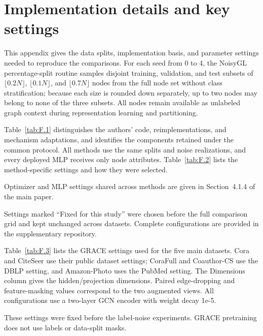 \documentclass[10pt,letterpaper,nopreprintline]{elsarticle}
\begin{document}
\setcounter{table}{0}

\section{Implementation details and key settings}\label{sec:F}

This appendix gives the data splits, implementation basis, and parameter settings needed to reproduce the comparisons. For each seed from 0 to 4, the NoisyGL percentage-split routine samples disjoint training, validation, and test subsets of \(\lfloor 0.2N\rfloor\), \(\lfloor 0.1N\rfloor\), and \(\lfloor 0.7N\rfloor\) nodes from the full node set without class stratification; because each size is rounded down separately, up to two nodes may belong to none of the three subsets. All nodes remain available as unlabeled graph context during representation learning and partitioning.

Table~\ref{tab:F.1} distinguishes the authors' code, reimplementations, and mechanism adaptations, and identifies the components retained under the common protocol. All methods use the same splits and noise realizations, and every deployed MLP receives only node attributes. Table~\ref{tab:F.2} lists the method-specific settings and how they were selected.



Optimizer and MLP settings shared across methods are given in Section~4.1.4 of the main paper.



Settings marked ``Fixed for this study'' were chosen before the full comparison grid and kept unchanged across datasets. Complete configurations are provided in the supplementary repository.

Table~\ref{tab:F.3} lists the GRACE settings used for the five main datasets. Cora and CiteSeer use their public dataset settings; CoraFull and Coauthor-CS use the DBLP setting, and Amazon-Photo uses the PubMed setting. The Dimensions column gives the hidden/projection dimensions. Paired edge-dropping and feature-masking values correspond to the two augmented views. All configurations use a two-layer GCN encoder with weight decay 1e-5.



These settings were fixed before the label-noise experiments. GRACE pretraining does not use labels or data-split masks.

\FloatBarrier
\end{document}
